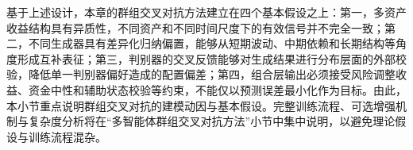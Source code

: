 基于上述设计，本章的群组交叉对抗方法建立在四个基本假设之上：第一，多资产收益结构具有异质性，不同资产和不同时间尺度下的有效信号并不完全一致；第二，不同生成器具有差异化归纳偏置，能够从短期波动、中期依赖和长期结构等角度形成互补表征；第三，判别器的交叉反馈能够对生成结果进行分布层面的外部校验，降低单一判别器偏好造成的配置偏差；第四，组合层输出必须接受风险调整收益、资金中性和辅助状态校验等约束，不能仅以预测误差最小化作为目标。由此，本小节重点说明群组交叉对抗的建模动因与基本假设。完整训练流程、可选增强机制与复杂度分析将在“多智能体群组交叉对抗方法”小节中集中说明，以避免理论假设与训练流程混杂。






